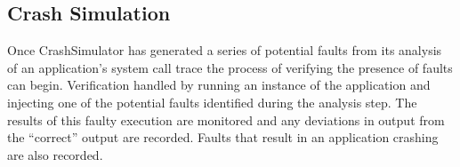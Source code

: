     \subsection{Crash Simulation}

        Once CrashSimulator has generated a series of potential faults from its analysis of an application's system call
        trace the process of verifying the presence of faults can begin. Verification handled by running an instance of
        the application and injecting one of the potential faults identified during the analysis step.  The results of
        this faulty execution are monitored and any deviations in output from the ``correct'' output are recorded.
        Faults that result in an application crashing are also recorded.

